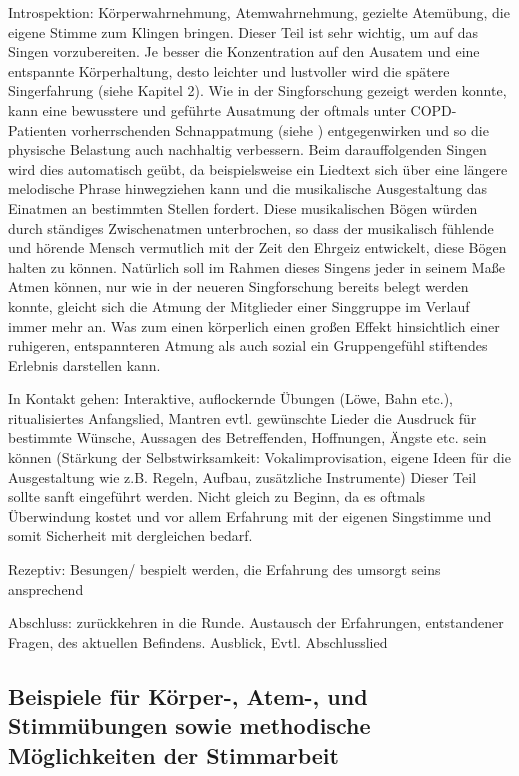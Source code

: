 Introspektion: 
Körperwahrnehmung, Atemwahrnehmung, gezielte Atemübung, die eigene Stimme zum Klingen bringen. Dieser Teil ist sehr wichtig, um auf das Singen vorzubereiten. Je besser die Konzentration auf den Ausatem und eine entspannte Körperhaltung, desto leichter und lustvoller wird die spätere Singerfahrung (siehe Kapitel 2). Wie in der Singforschung gezeigt werden konnte, kann eine bewusstere und geführte Ausatmung der oftmals unter COPD-Patienten vorherrschenden Schnappatmung (siehe \label{copd}) entgegenwirken und so die physische Belastung auch nachhaltig verbessern. Beim darauffolgenden Singen wird dies automatisch geübt, da beispielsweise ein Liedtext sich über eine längere melodische Phrase hinwegziehen kann und die musikalische Ausgestaltung das Einatmen an bestimmten Stellen fordert. Diese musikalischen Bögen würden durch ständiges Zwischenatmen unterbrochen, so dass der musikalisch fühlende und hörende Mensch vermutlich mit der Zeit den Ehrgeiz entwickelt, diese Bögen halten zu können. Natürlich soll im Rahmen dieses Singens jeder in seinem Maße Atmen können, nur wie in der neueren Singforschung bereits belegt werden konnte, gleicht sich die Atmung der Mitglieder einer Singgruppe im Verlauf immer mehr an. Was zum einen körperlich einen großen Effekt hinsichtlich einer ruhigeren, entspannteren Atmung als auch sozial ein Gruppengefühl stiftendes Erlebnis darstellen kann.

In Kontakt gehen: 
Interaktive, auflockernde Übungen (Löwe, Bahn etc.), ritualisiertes Anfangslied, Mantren evtl. gewünschte Lieder die Ausdruck für bestimmte Wünsche, Aussagen des Betreffenden, Hoffnungen, Ängste etc. sein können
(Stärkung der Selbstwirksamkeit: Vokalimprovisation, eigene Ideen für die Ausgestaltung wie z.B. Regeln, Aufbau, zusätzliche Instrumente) Dieser Teil sollte sanft eingeführt werden. Nicht gleich zu Beginn, da es oftmals Überwindung kostet und vor allem Erfahrung mit der eigenen Singstimme und somit Sicherheit mit dergleichen bedarf.

Rezeptiv: 
Besungen/ bespielt werden, die Erfahrung des umsorgt seins ansprechend

Abschluss: 
zurückkehren in die Runde. Austausch der Erfahrungen, entstandener Fragen, des aktuellen Befindens. Ausblick, Evtl. Abschlusslied

\subsection{Beispiele für Körper-, Atem-, und Stimmübungen sowie methodische Möglichkeiten der Stimmarbeit}


